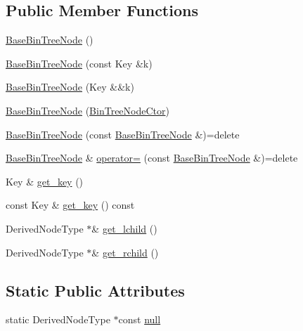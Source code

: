 \subsection*{Public Member Functions}
\begin{DoxyCompactItemize}
\item 
\hyperlink{class_designar_1_1_base_bin_tree_node_a2779b1f30e23443940aaa0ddfec895be}{Base\+Bin\+Tree\+Node} ()
\item 
\hyperlink{class_designar_1_1_base_bin_tree_node_a19dbfd3695d9213dc0d50a4637e92b16}{Base\+Bin\+Tree\+Node} (const Key \&k)
\item 
\hyperlink{class_designar_1_1_base_bin_tree_node_aaf8196a9b42a719173d03340f68b467f}{Base\+Bin\+Tree\+Node} (Key \&\&k)
\item 
\hyperlink{class_designar_1_1_base_bin_tree_node_a29c18682569084f8f64ca58b22f8f74a}{Base\+Bin\+Tree\+Node} (\hyperlink{namespace_designar_a679bc99fd69a3601faa5d6d47f865106}{Bin\+Tree\+Node\+Ctor})
\item 
\hyperlink{class_designar_1_1_base_bin_tree_node_a455b27b565e1dc004fd6292475d5a9de}{Base\+Bin\+Tree\+Node} (const \hyperlink{class_designar_1_1_base_bin_tree_node}{Base\+Bin\+Tree\+Node} \&)=delete
\item 
\hyperlink{class_designar_1_1_base_bin_tree_node}{Base\+Bin\+Tree\+Node} \& \hyperlink{class_designar_1_1_base_bin_tree_node_acde689f73c8d4fce33926e86882b0765}{operator=} (const \hyperlink{class_designar_1_1_base_bin_tree_node}{Base\+Bin\+Tree\+Node} \&)=delete
\item 
Key \& \hyperlink{class_designar_1_1_base_bin_tree_node_a59c9489fff0bd46c058e901d02b2e582}{get\+\_\+key} ()
\item 
const Key \& \hyperlink{class_designar_1_1_base_bin_tree_node_ab836466417ce1dad15b794424f39ee4b}{get\+\_\+key} () const
\item 
Derived\+Node\+Type $\ast$\& \hyperlink{class_designar_1_1_base_bin_tree_node_a60f8c88c08e4b68ecc9dd9a77b69cb7c}{get\+\_\+lchild} ()
\item 
Derived\+Node\+Type $\ast$\& \hyperlink{class_designar_1_1_base_bin_tree_node_a328220c701b0c58b024610cf8fb70850}{get\+\_\+rchild} ()
\end{DoxyCompactItemize}
\subsection*{Static Public Attributes}
\begin{DoxyCompactItemize}
\item 
static Derived\+Node\+Type $\ast$const \hyperlink{class_designar_1_1_base_bin_tree_node_a0ea0251169acae6e7943ccc54f66472a}{null}
\end{DoxyCompactItemize}


